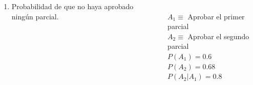 \documentclass[aspectratio=149,10pt,t]{beamer}
\begin{document}
\begin{frame}
	\begin{columns}
		\begin{column}[T]{0.6\textwidth}
			\begin{enumerate}
			  \item Probabilidad de que no haya aprobado ningún parcial.
		  \end{enumerate}
		\end{column}
		\begin{column}[T]{0.4\textwidth}
			\\
			$A_1 \equiv$ Aprobar el primer parcial\\
			$A_2 \equiv$ Aprobar el segundo parcial\\
			$P(A_1)=0.6$\\
			$P(A_2)=0.68$\\
			$P(A_2|A_1)=0.8$
		\end{column}
	\end{columns}
\end{frame}
\end{document}
